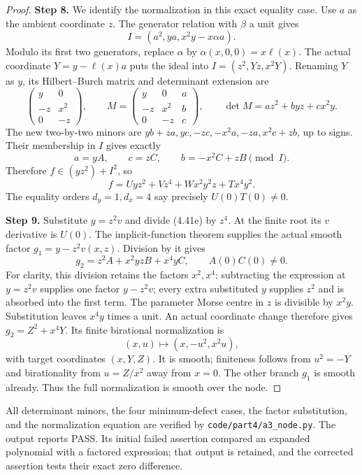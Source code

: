 \begin{proof}
\noindent\textbf{Step 8.} We identify the normalization in this exact equality case.
Use $a$ as the ambient coordinate $z$. The generator relation
with $\beta$ a unit gives
\[
                    I=(a^2,ya,x^2y-x\alpha a).
\]
Modulo its first two generators, replace $\alpha$ by
$\alpha(x,0,0)=x\ell(x)$. The actual coordinate
$Y=y-\ell(x)a$ puts the ideal into
$I=(z^2,Yz,x^2Y)$. Renaming $Y$ as $y$, its Hilbert--Burch
matrix and determinant extension are
\[
 \begin{pmatrix}y&0\\-z&x^2\\0&-z\end{pmatrix},
 \qquad
 M=\begin{pmatrix}y&0&a\\-z&x^2&b\\0&-z&c\end{pmatrix},
 \qquad
 \det M=az^2+byz+cx^2y.
\]
The new two-by-two minors are
$yb+za,yc,-zc,-x^2a,-za,x^2c+zb$, up to signs.
Their membership in $I$ gives exactly
\[
             a=yA,\qquad c=zC,\qquad b=-x^2C+zB
                          \pmod I.
\]
Therefore $f\in(yz^2)+I^2$, so
\[
           f=Uyz^2+Vz^4+Wx^2y^2z+Tx^4y^2.            \tag{4.41e}
\]
The equality orders $d_y=1,d_x=4$ say precisely
$U(0)T(0)\ne0$.

\noindent\textbf{Step 9.} Substitute $y=z^2v$ and divide (4.41e) by $z^4$.
At the finite root its $v$ derivative is $U(0)$.
The implicit-function theorem supplies the actual smooth
factor $g_1=y-z^2v(x,z)$. Division by it gives
\[
                  g_2=z^2A+x^2yzB+x^4yC,
                  \qquad A(0)C(0)\ne0.
\]
For clarity, this division retains the factors $x^2,x^4$:
subtracting the expression at $y=z^2v$ supplies one factor
$y-z^2v$; every extra substituted $y$ supplies $z^2$ and
is absorbed into the first term. The parameter Morse
centre in $z$ is divisible by $x^2y$. Substitution leaves
$x^4y$ times a unit. An actual coordinate change therefore
gives $g_2=Z^2+x^4Y$. Its finite birational normalization is
\[
                 (x,u)\longmapsto(x,-u^2,x^2u),
\]
with target coordinates $(x,Y,Z)$. It is smooth; finiteness
follows from $u^2=-Y$ and birationality from $u=Z/x^2$
away from $x=0$. The other branch $g_1$ is smooth already.
Thus the full normalization is smooth over the node.
\end{proof}

All determinant minors, the four minimum-defect cases,
the factor substitution, and the normalization equation
are verified by \texttt{code/part4/a3\_node.py}.
The output reports PASS. Its initial failed assertion
compared an expanded polynomial with a factored expression;
that output is retained, and the corrected assertion tests
their exact zero difference.

